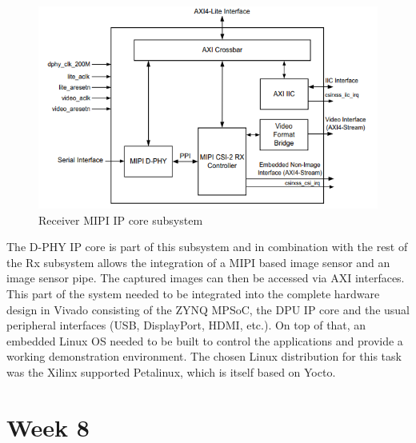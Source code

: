 \begin{figure}[!htb]
	\centering
		\includegraphics[width=\textwidth]{bilder/MIPI_rx.png}
		\caption{Receiver \acs{MIPI} \acs{IP} core subsystem~\cite{mipi-rx}}
		\label{fig:MIPI_rx}
\end{figure}
The D-PHY \ac{IP} core is part of this subsystem and in combination with the rest of the Rx subsystem allows the integration of a \ac{MIPI} based image sensor and an image sensor pipe. The captured images can then be accessed via \ac{AXI} interfaces. This part of the system needed to be integrated into the complete hardware design in Vivado consisting of the ZYNQ \ac{MPSoC}, the \ac{DPU} \ac{IP} core and the usual peripheral interfaces (\ac{USB}, DisplayPort, HDMI, etc.). On top of that, an embedded Linux \ac{OS} needed to be built to control the applications and provide a working demonstration environment. The chosen Linux distribution for this task was the Xilinx supported Petalinux, which is itself based on Yocto.

\section{Week 8}
